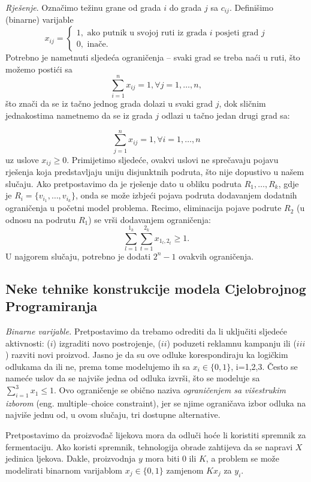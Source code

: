 \documentclass[a4paper, utf8, 11pt, colorlinks]{article}
\begin{document}
\emph{Rješenje}. Označimo težinu grane od grada $i$ do grada $j$ sa $c_{ij}$.  Definišimo (binarne) varijable 
$$x_{ij} = \begin{cases}
                1, \mbox{ ako putnik u svojoj ruti iz grada } i \mbox{ posjeti grad } j \\
                0, \mbox{ inače}. 
          \end{cases}$$ 
Potrebno je nametnuti sljedeća ograničenja -- svaki grad se treba naći u ruti,  što možemo postići sa 
$$  \sum_{i=1}^n x_{ij} = 1, \forall j =1,\ldots, n,$$ 
što znači da se iz tačno jednog grada dolazi u svaki grad $j$, dok sličnim jednakostima nametnemo da se iz grada $j$ odlazi u tačno jedan drugi grad sa:

$$  \sum_{j=1}^n x_{ij} = 1, \forall i =1,\ldots, n$$ 
 uz uslove $x_{ij}\geq 0$. Primijetimo sljedeće, ovakvi uslovi ne sprečavaju pojavu rješenja koja predstavljaju uniju disjunktnih podruta, što nije dopustivo u našem slučaju. Ako pretpostavimo da je rješenje dato u obliku podruta $R_1, \ldots, R_k$, gdje je $R_i = \{ v_{i_1}, \ldots, v_{i_k} \}$, onda se može izbjeći pojava podruta dodavanjem dodatnih ograničenja u početni model problema. Recimo, eliminacija pojave podrute $R_2$ (u odnosu na podrutu $R_1$) se vrši dodavanjem ograničenja:
 $$ \sum_{l=1}^{1_k}\sum_{t=1}^{2_k} x_{1_l, 2_t} \geq 1.$$
 U najgorem slučaju, potrebno je dodati $2^n-1$ ovakvih ograničenja. 
 
 \subsection{Neke tehnike konstrukcije modela Cjelobrojnog Programiranja}
 
 \emph{Binarne varijable.} Pretpostavimo da trebamo odrediti da li uključiti sljedeće aktivnosti: ($i$) izgraditi novo postrojenje,
($ii$) poduzeti reklamnu kampanju ili ($iii$) razviti novi proizvod. Jasno je da su ove odluke korespondiraju ka logičkim odlukama da ili ne, prema tome modelujemo ih sa  $x_i \in \{0, 1 \}$, i=1,2,3. Često se nameće uslov da se najviše jedna od odluka izvrši, što se modeluje sa $\sum_{i=1}^3 x_1 \leq 1$. Ovo ograničenje se obično naziva \emph{ograničenjem sa višestrukim izborom} (eng. multiple--choice constraint), jer se njime ograničava izbor odluka na najviše jednu od, u ovom slučaju, tri dostupne alternative. 


Pretpostavimo da proizvođač lijekova mora da odluči hoće li koristiti spremnik za fermentaciju. Ako koristi spremnik, tehnologija obrade zahtijeva da se napravi $X$ jedinica ljekova. Dakle, proizvodnja $y$ mora biti 0 ili $K$, a problem se može modelirati binarnom varijablom $x_j \in \{ 0, 1\}$ zamjenom $Kx_j$ za $y_i$. 
\end{document}
